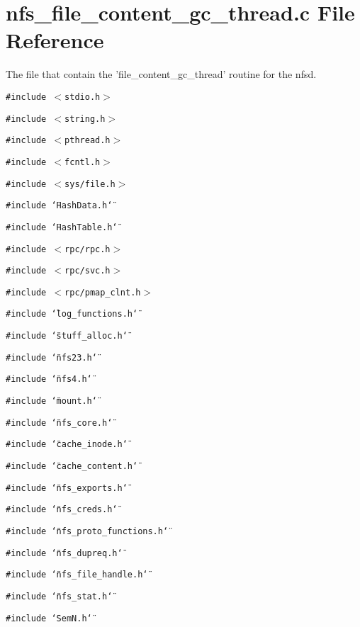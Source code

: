 \section{nfs\_\-file\_\-content\_\-gc\_\-thread.c File Reference}
\label{nfs__file__content__gc__thread_8c}
The file that contain the 'file\_\-content\_\-gc\_\-thread' routine for the nfsd. 

{\tt \#include $<$stdio.h$>$}\par
{\tt \#include $<$string.h$>$}\par
{\tt \#include $<$pthread.h$>$}\par
{\tt \#include $<$fcntl.h$>$}\par
{\tt \#include $<$sys/file.h$>$}\par
{\tt \#include \char`\"{}Hash\-Data.h\char`\"{}}\par
{\tt \#include \char`\"{}Hash\-Table.h\char`\"{}}\par
{\tt \#include $<$rpc/rpc.h$>$}\par
{\tt \#include $<$rpc/svc.h$>$}\par
{\tt \#include $<$rpc/pmap\_\-clnt.h$>$}\par
{\tt \#include \char`\"{}log\_\-functions.h\char`\"{}}\par
{\tt \#include \char`\"{}stuff\_\-alloc.h\char`\"{}}\par
{\tt \#include \char`\"{}nfs23.h\char`\"{}}\par
{\tt \#include \char`\"{}nfs4.h\char`\"{}}\par
{\tt \#include \char`\"{}mount.h\char`\"{}}\par
{\tt \#include \char`\"{}nfs\_\-core.h\char`\"{}}\par
{\tt \#include \char`\"{}cache\_\-inode.h\char`\"{}}\par
{\tt \#include \char`\"{}cache\_\-content.h\char`\"{}}\par
{\tt \#include \char`\"{}nfs\_\-exports.h\char`\"{}}\par
{\tt \#include \char`\"{}nfs\_\-creds.h\char`\"{}}\par
{\tt \#include \char`\"{}nfs\_\-proto\_\-functions.h\char`\"{}}\par
{\tt \#include \char`\"{}nfs\_\-dupreq.h\char`\"{}}\par
{\tt \#include \char`\"{}nfs\_\-file\_\-handle.h\char`\"{}}\par
{\tt \#include \char`\"{}nfs\_\-stat.h\char`\"{}}\par
{\tt \#include \char`\"{}Sem\-N.h\char`\"{}}\par
